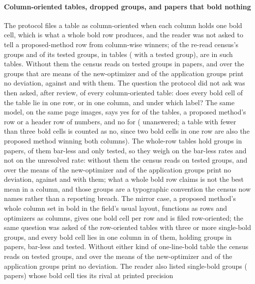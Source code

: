 \documentclass[preprint,review,12pt]{elsarticle}
\begin{document}
\paragraph{Column-oriented tables, dropped groups, and papers that bold nothing} The protocol files a table as column-oriented when each column holds one bold cell, which is what a whole bold row produces, and the reader was not asked to tell a proposed-method row from column-wise winners; \nCrcColGroups{} of the re-read census's groups and \nCrcColTested{} of its tested groups, in \nCrcColTables{} tables (\nCrcColTablesTested{} with a tested group), are in such tables. Without them the census reads \nCrcNocolFail{} \nCrcNocolFailCi{} on \nCrcNocolTested{} tested groups in \nCrcNocolTestedPapers{} papers, and over the groups that are means \nCrcNocolMeansNewOptimizerNeither{} of the new-optimizer and \nCrcNocolMeansApplicationNeither{} of the application groups print no deviation, against \nCrcMeansNewOptimizerNeither{} and \nCrcMeansApplicationNeither{} with them. The question the protocol did not ask was then asked, after review, of every column-oriented table: does every bold cell of the table lie in one row, or in one column, and under which label? The same model, on the same page images, says yes for \nCrcWholeRowTables{} of the \nCrcColTables{} tables, a proposed method's row or a header row of numbers, and no for \nCrcWholeRowTablesNo{} (\nCrcWholeRowTablesUnanswered{} unanswered; a table with fewer than three bold cells is counted as no, since two bold cells in one row are also the proposed method winning both columns). The whole-row tables hold \nCrcWrGroups{} groups in \nCrcWrPapers{} papers, \nCrcWrNeither{} of them bar-less and only \nCrcWrTested{} tested, so they weigh on the bar-less rates and not on the unresolved rate: without them the census reads \nCrcNowrFail{} \nCrcNowrFailCi{} on \nCrcNowrTested{} tested groups, and over the means \nCrcNowrMeansNewOptimizerNeither{} of the new-optimizer and \nCrcNowrMeansApplicationNeither{} of the application groups print no deviation, against \nCrcMeansNewOptimizerNeither{} and \nCrcMeansApplicationNeither{} with them; what a whole bold row claims is not the best mean in a column, and those groups are a typographic convention the census now names rather than a reporting breach. The mirror case, a proposed method's whole column set in bold in the field's usual layout, functions as rows and optimizers as columns, gives one bold cell per row and is filed row-oriented; the same question was asked of the \nCrcWholeColAsked{} row-oriented tables with three or more single-bold groups, and every bold cell lies in one column in \nCrcWholeColTables{} of them, holding \nCrcWcGroups{} groups in \nCrcWcPapers{} papers, \nCrcWcNeither{} bar-less and \nCrcWcTested{} tested. Without either kind of one-line-bold table the census reads \nCrcNolineFail{} \nCrcNolineFailCi{} on \nCrcNolineTested{} tested groups, and over the means \nCrcNolineMeansNewOptimizerNeither{} of the new-optimizer and \nCrcNolineMeansApplicationNeither{} of the application groups print no deviation. The reader also listed \nCrcDroppedNonextremal{} single-bold groups (\nCrcDroppedNonextremalPapers{} papers) whose bold cell ties its rival at printed precision 
\end{document}
